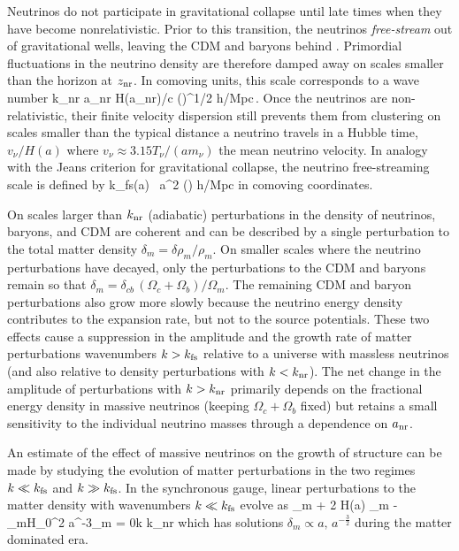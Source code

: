 Neutrinos do not participate in gravitational collapse until late times when they have become nonrelativistic. Prior to this transition, the neutrinos {\em free-stream} out of gravitational wells, leaving the CDM and baryons behind  \cite{Bond:1983hb, Ma:1996za, Hu:1997vi, Hu:1997mj}. Primordial fluctuations in the neutrino density are therefore damped away on scales smaller than the horizon at $z_{\rm nr}$. In comoving units, this scale corresponds to a wave number
\beq
k_{\rm nr} \equiv a_{\rm nr} H(a_{\rm nr})/c  \left(\right)^{1/2} h/{\rm Mpc}\,.
\eeq
Once the neutrinos are non-relativistic, their finite velocity dispersion still prevents them from clustering on scales smaller than the typical distance a neutrino travels in a Hubble time, $v_\nu /H(a)$ where $v_\nu \approx 3.15 T_\nu/(a m_\nu)$ the mean neutrino velocity. In analogy with the Jeans criterion for gravitational collapse, the neutrino free-streaming scale is defined by \cite{Bond:1983hb, Lesgourgues:2006nd}
\beq
k_{\rm fs}(a) \equiv {} \, a^2 \left(\right) h/{\rm Mpc}
\eeq
in comoving coordinates. 

On scales larger than $k_{\rm nr}$ (adiabatic) perturbations in the density of neutrinos, baryons, and CDM are coherent and can be described by a single perturbation to the total matter density $\delta_m= \delta \rho_m/\rho_m$. On smaller scales where the neutrino perturbations have decayed, only the perturbations to the CDM and baryons remain so that $\delta_{m} = \delta_{cb}\, (\Omega_{c} + \Omega_b)/\Omega_m $. The remaining CDM and baryon perturbations also grow more slowly because the neutrino energy density contributes to the expansion rate, but not to the source potentials. These two effects cause a suppression in the amplitude and the growth rate of matter perturbations wavenumbers $k > k_{\rm fs}$ relative to a universe with massless neutrinos (and also relative to density perturbations with $k<k_{\rm nr}$). The net change in the amplitude of perturbations with $k > k_{\rm nr}$ primarily depends on the fractional energy density in massive neutrinos (keeping $\Omega_c+\Omega_b$ fixed) but retains a small sensitivity to the individual neutrino masses through a dependence on $a_{\rm nr}$. 

An estimate of the effect of massive neutrinos on the growth of structure can be made by studying the evolution of matter perturbations in the two regimes $k\ll k_{\rm fs}$ and $k\gg k_{\rm fs}$.  In the synchronous gauge, linear perturbations to the matter density with wavenumbers $k \ll k_{\rm fs}$ evolve as
\beq
\label{eq:ddotdeltalarge}
\ddot{\delta}_m + 2 H(a) \dot\delta_m - \Omega_mH_0^2 a^{-3}\delta_m = 0\quad k \ll k_{\rm nr}
\eeq
which has solutions $\delta_m \propto a, \, a^{-\frac{3}{2}}$ during the matter dominated era. %

